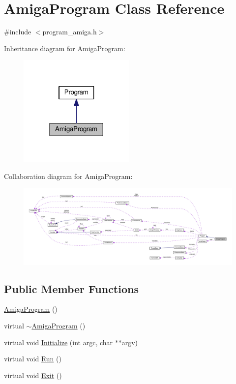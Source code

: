 \hypertarget{classAmigaProgram}{}\section{Amiga\+Program Class Reference}
\label{classAmigaProgram}


{\ttfamily \#include $<$program\+\_\+amiga.\+h$>$}



Inheritance diagram for Amiga\+Program\+:
\nopagebreak
\begin{figure}[H]
\begin{center}
\leavevmode
\includegraphics[width=161pt]{d0/de1/classAmigaProgram__inherit__graph}
\end{center}
\end{figure}


Collaboration diagram for Amiga\+Program\+:
\nopagebreak
\begin{figure}[H]
\begin{center}
\leavevmode
\includegraphics[width=350pt]{da/de2/classAmigaProgram__coll__graph}
\end{center}
\end{figure}
\subsection*{Public Member Functions}
\begin{DoxyCompactItemize}
\item 
\hyperlink{classAmigaProgram_adaf7552b13bf6526381c5bceb438e1ef}{Amiga\+Program} ()
\item 
virtual \hyperlink{classAmigaProgram_aa93f40c4cba28c4a88c9854c4c5bea6a}{$\sim$\+Amiga\+Program} ()
\item 
virtual void \hyperlink{classAmigaProgram_ac98b0caed0ea8fcb4e8a8a922f9b93de}{Initialize} (int argc, char $\ast$$\ast$argv)
\item 
virtual void \hyperlink{classAmigaProgram_a1bfed5f5b69a85aa3ef1a39ea02dc457}{Run} ()
\item 
virtual void \hyperlink{classAmigaProgram_ad662b535d612f6ed9df4f59ad60fe6a0}{Exit} ()
\end{DoxyCompactItemize}
